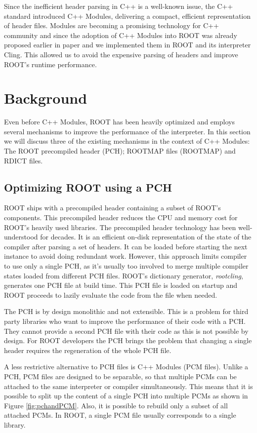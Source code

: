 \documentclass{webofc}
\begin{document}
Since the inefficient header parsing in C++ is a well-known issue, the C++ standard introduced C++ Modules, delivering a compact, efficient representation of header files. Modules are becoming a promising technology for C++ community and since the adoption of C++ Modules into ROOT was already proposed earlier in paper \cite{vassil-paper} and we implemented them in ROOT and its interpreter Cling. This allowed us to avoid the expensive parsing of headers and improve ROOT's runtime performance.

\section{Background}
\label{background}

Even before C++ Modules, ROOT has been heavily optimized and employs several mechanisms to improve the performance of the interpreter. In this section we will discuss three of the existing mechanisms in the context of C++ Modules: The ROOT precompiled header (PCH); ROOTMAP files (ROOTMAP) and RDICT files.

\subsection{Optimizing ROOT using a PCH}
\label{pch}
ROOT ships with a precompiled header containing a subset of ROOT's components. This precompiled header reduces the CPU and memory cost for ROOT’s heavily used libraries. The precompiled header technology has been well-understood for decades. It is an efficient on-disk representation of the state of the compiler after parsing a set of headers. It can be loaded before starting the next instance to avoid doing redundant work. However, this approach limits compiler to use only a single PCH, as it's usually too involved to merge multiple compiler states loaded from different PCH files. ROOT’s dictionary generator, \textit{rootcling}, generates one PCH file at build time. This PCH file is loaded on startup and ROOT proceeds to lazily evaluate the code from the file when needed.

The PCH is by design monolithic and not extensible. This is a problem for third party libraries who want to improve the performance of their code with a PCH. They cannot provide a second PCH file with their code as this is not possible by design. For ROOT developers the PCH brings the problem that changing a single header requires the regeneration of the whole PCH file.

A less restrictive alternative to PCH files is C++ Modules (PCM files). Unlike a PCH, PCM files are designed to be separable, so that multiple PCMs can be attached to the same interpreter or compiler simultaneously. This means that it is possible to split up the content of a single PCH into multiple PCMs as shown in Figure \ref{fig:pchandPCM}. Also, it is possible to rebuild only a subset of all attached PCMs. In ROOT, a single PCM file usually corresponds to a single library.
\end{document}
